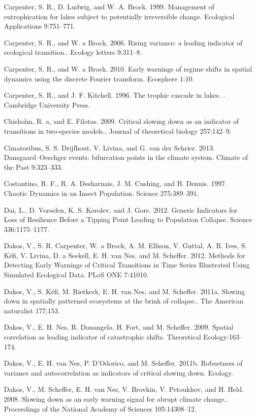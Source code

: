 \documentclass{article}
\begin{document}
Carpenter, S. R., D. Ludwig, and W. A. Brock. 1999. Management of
eutrophication for lakes subject to potentially irreversible change.
Ecological Applications 9:751--771.

Carpenter, S. R., and W. a Brock. 2006. Rising variance: a leading
indicator of ecological transition.. Ecology letters 9:311--8.

Carpenter, S. R., and W. a Brock. 2010. Early warnings of regime shifts
in spatial dynamics using the discrete Fourier transform. Ecosphere
1:10.

Carpenter, S. R., and J. F. Kitchell. 1996. The trophic cascade in
lakes. . Cambridge University Press.

Chisholm, R. a, and E. Filotas. 2009. Critical slowing down as an
indicator of transitions in two-species models.. Journal of theoretical
biology 257:142--9.

Cimatoribus, S. S. Drijfhout, V. Livina, and G. van der Schrier. 2013.
Dansgaard--Oeschger events: bifurcation points in the climate system.
Climate of the Past 9:323--333.

Costantino, R. F., R. A. Desharnais, J. M. Cushing, and B. Dennis. 1997.
Chaotic Dynamics in an Insect Population. Science 275:389--391.

Dai, L., D. Vorselen, K. S. Korolev, and J. Gore. 2012. Generic
Indicators for Loss of Resilience Before a Tipping Point Leading to
Population Collapse. Science 336:1175--1177.

Dakos, V., S. R. Carpenter, W. a Brock, A. M. Ellison, V. Guttal, A. R.
Ives, S. Kéfi, V. Livina, D. a Seekell, E. H. van Nes, and M. Scheffer.
2012. Methods for Detecting Early Warnings of Critical Transitions in
Time Series Illustrated Using Simulated Ecological Data. PLoS ONE
7:41010.

Dakos, V., S. Kéfi, M. Rietkerk, E. H. van Nes, and M. Scheffer. 2011a.
Slowing down in spatially patterned ecosystems at the brink of
collapse.. The American naturalist 177:153.

Dakos, V., E. H. Nes, R. Donangelo, H. Fort, and M. Scheffer. 2009.
Spatial correlation as leading indicator of catastrophic shifts.
Theoretical Ecology:163--174.

Dakos, V., E. H. van Nes, P. D'Odorico, and M. Scheffer. 2011b.
Robustness of variance and autocorrelation as indicators of critical
slowing down. Ecology.

Dakos, V., M. Scheffer, E. H. van Nes, V. Brovkin, V. Petoukhov, and H.
Held. 2008. Slowing down as an early warning signal for abrupt climate
change.. Proceedings of the National Academy of Sciences 105:14308--12.
\end{document}
